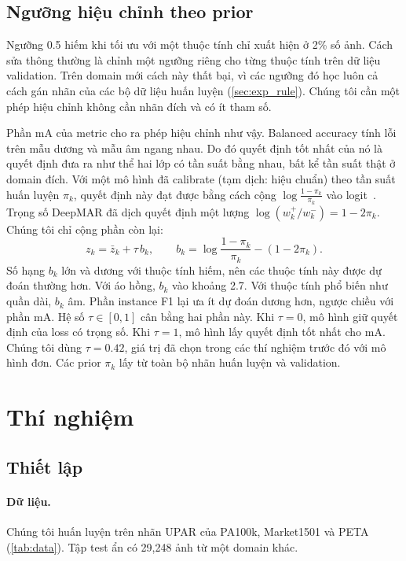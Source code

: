 \documentclass[10pt,twocolumn,letterpaper]{article}
\begin{document}
\subsection{Ngưỡng hiệu chỉnh theo prior}
\label{sec:rule}

Ngưỡng 0.5 hiếm khi tối ưu với một thuộc tính chỉ xuất hiện ở 2\% số ảnh. Cách sửa thông thường là chỉnh một ngưỡng riêng cho từng thuộc tính trên dữ liệu validation. Trên domain mới cách này thất bại, vì các ngưỡng đó học luôn cả cách gán nhãn của các bộ dữ liệu huấn luyện (\cref{sec:exp_rule}). Chúng tôi cần một phép hiệu chỉnh không cần nhãn đích và có ít tham số.

Phần mA của metric cho ra phép hiệu chỉnh như vậy. Balanced accuracy tính lỗi trên mẫu dương và mẫu âm ngang nhau. Do đó quyết định tốt nhất của nó là quyết định đưa ra như thể hai lớp có tần suất bằng nhau, bất kể tần suất thật ở domain đích. Với một mô hình đã calibrate (tạm dịch: hiệu chuẩn) theo tần suất huấn luyện $\pi_k$, quyết định này đạt được bằng cách cộng $\log\frac{1-\pi_k}{\pi_k}$ vào logit~\cite{saerens,logitadj}. Trọng số DeepMAR đã dịch quyết định một lượng $\log(w_k^{+}/w_k^{-})=1-2\pi_k$. Chúng tôi chỉ cộng phần còn lại:
\begin{equation}
z_k=\bar z_k+\tau\,b_k,\qquad b_k=\log\frac{1-\pi_k}{\pi_k}-(1-2\pi_k).
\label{eq:rule}
\end{equation}
Số hạng $b_k$ lớn và dương với thuộc tính hiếm, nên các thuộc tính này được dự đoán thường hơn. Với áo hồng, $b_k$ vào khoảng 2.7. Với thuộc tính phổ biến như quần dài, $b_k$ âm. Phần instance F1 lại ưa ít dự đoán dương hơn, ngược chiều với phần mA. Hệ số $\tau\in[0,1]$ cân bằng hai phần này. Khi $\tau=0$, mô hình giữ quyết định của loss có trọng số. Khi $\tau=1$, mô hình lấy quyết định tốt nhất cho mA. Chúng tôi dùng $\tau=0.42$, giá trị đã chọn trong các thí nghiệm trước đó với mô hình đơn. Các prior $\pi_k$ lấy từ toàn bộ nhãn huấn luyện và validation.

\section{Thí nghiệm}
\label{sec:experiments}

\subsection{Thiết lập}
\label{sec:setup}

\paragraph{Dữ liệu.} Chúng tôi huấn luyện trên nhãn UPAR của PA100k, Market1501 và PETA (\cref{tab:data}). Tập test ẩn có 29{,}248 ảnh từ một domain khác.
\end{document}
